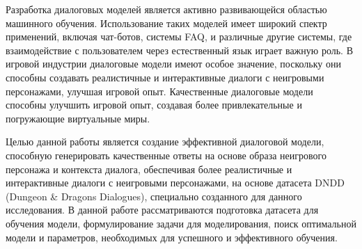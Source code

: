 Разработка диалоговых моделей является активно развивающейся областью машинного обучения. Использование таких моделей имеет широкий спектр применений, включая чат-ботов, системы FAQ, и различные другие системы, где взаимодействие с пользователем через естественный язык играет важную роль. В игровой индустрии диалоговые модели имеют особое значение, поскольку они способны создавать реалистичные и интерактивные диалоги с неигровыми персонажами, улучшая игровой опыт. Качественные диалоговые модели способны улучшить игровой опыт, создавая более привлекательные и погружающие виртуальные миры.

Целью данной работы является создание эффективной диалоговой модели, способную генерировать качественные ответы на основе образа неигрового персонажа и контекста диалога, обеспечивая более реалистичные и интерактивные диалоги с неигровыми персонажами, на основе датасета DNDD (Dungeon \& Dragons Dialogues), специально созданного для данного исследования. В данной работе рассматриваются подготовка датасета для обучения модели, формулирование задачи для моделирования, поиск оптимальной модели и параметров, необходимых для успешного и эффективного обучения.